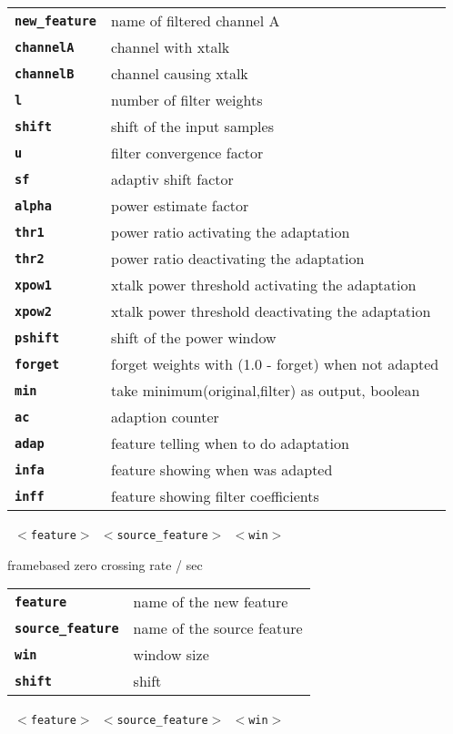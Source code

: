 \begin{description}
\begin{description}
      \begin{tabular}{ll}
 \texttt{\textbf{new\_feature}} &  name of filtered channel A \\
 \texttt{\textbf{channelA}} &     channel with xtalk \\
 \texttt{\textbf{channelB}} &     channel causing xtalk \\
 \texttt{\textbf{l}} &             number of filter weights  \\
 \texttt{\textbf{shift}} &         shift of the input samples  \\
 \texttt{\textbf{u}} &             filter convergence factor  \\
 \texttt{\textbf{sf}} &            adaptiv shift factor  \\
 \texttt{\textbf{alpha}} &         power estimate factor  \\
 \texttt{\textbf{thr1}} &          power ratio activating the adaptation  \\
 \texttt{\textbf{thr2}} &          power ratio deactivating the adaptation  \\
 \texttt{\textbf{xpow1}} &         xtalk power threshold activating the adaptation  \\
 \texttt{\textbf{xpow2}} &         xtalk power threshold deactivating the adaptation  \\
 \texttt{\textbf{pshift}} &        shift of the power window  \\
 \texttt{\textbf{forget}} &        forget weights with (1.0 - forget) when not adapted  \\
 \texttt{\textbf{min}} &           take minimum(original,filter) as output, boolean  \\
 \texttt{\textbf{ac}} &            adaption counter  \\
 \texttt{\textbf{adap}} &          feature telling when to do adaptation \\
 \texttt{\textbf{infa}} &          feature showing when was adapted \\
 \texttt{\textbf{inff}} &          feature showing filter coefficients \\
      \end{tabular}
       \texttt{ $<$feature$>$ $<$source\_feature$>$ $<$win$>$ } \

        framebased zero crossing rate / sec

      \begin{tabular}{ll}
 \texttt{\textbf{feature}} &         name of the new feature \\
 \texttt{\textbf{source\_feature}} &  name of the source feature \\
 \texttt{\textbf{win}} &             window size  \\
 \texttt{\textbf{shift}} &            shift  \\
      \end{tabular}
       \texttt{ $<$feature$>$ $<$source\_feature$>$ $<$win$>$   } \


\end{description}
\end{description}
